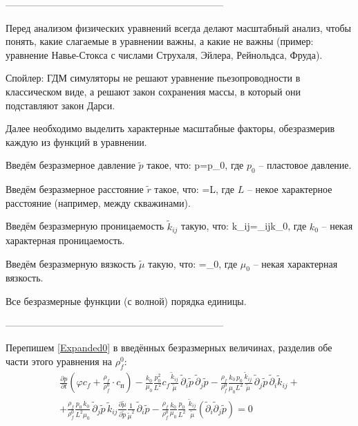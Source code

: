 --------------------------------------------------------------------

Перед анализом физических уравнений всегда делают масштабный анализ, чтобы понять, какие слагаемые в уравнении важны, а какие не важны (пример: уравнение Навье-Стокса с числами Струхаля, Эйлера, Рейнольдса, Фруда).

Спойлер: ГДМ симуляторы не решают уравнение пьезопроводности в классическом виде, а решают закон сохранения массы, в который они подставляют закон Дарси.

Далее необходимо выделить характерные масштабные факторы, обезразмерив каждую из функций в уравнении.

Введём безразмерное давление $\tilde{p}$ такое, что:
\beq
p=\cdot p_0,
\eeq
где $p_0$ -- пластовое давление.

Введём безразмерное расстояние $\tilde{r}$ такое, что:
\beq
{}=\cdot L,
\eeq
где $L$ -- некое характерное расстояние (например, между скважинами).

Введём безразмерную проницаемость $\tilde{k}_{ij}$ такую, что:
\beq
k_{ij}=_{ij}\cdot k_0,
\eeq
где $k_0$ -- некая характерная проницаемость.

Введём безразмерную вязкость $\tilde{\mu}$ такую, что:
\beq
\mu=\tilde{\mu}\cdot\mu_0,
\eeq
где $\mu_0$ -- некая характерная вязкость.

Все безразмерные функции (с волной) порядка единицы.

--------------------------------------------------------------------

Перепишем \eqref{Expanded0} в введённых безразмерных величинах, разделив обе части этого уравнения на $\rho_f^0$:
\begin{multline}
\frac{\partial p}{\partial t}\left(\varphi c_f+\frac{\rho_f}{\rho_f^0}\cdot c_\text{п}\right)-\frac{k_0}{\mu_0}\frac{p_0^2}{L^2}c_f\frac{\tilde{k}_{ij}}{\tilde{\mu}}\,\tilde{\partial}_i\tilde{p}\,\tilde{\partial}_j\tilde{p}-\frac{\rho_f}{\rho_f^0}\frac{k_0\,p_0}{\mu_0L^2}\frac{\tilde{k}_{ij}}{\tilde{\mu}}\,\tilde{\partial}_j\tilde{p}\,\tilde{\partial}_i\tilde{k}_{ij}+\\+\frac{\rho_f}{\rho_f^0}\frac{p_0\,k_0}{L^2\mu_0}\,\tilde{\partial}_j\tilde{p}\,\tilde{k}_{ij}\frac{\partial\tilde{\mu}}{\partial\tilde{p}}\frac{1}{\tilde{\mu}^2}\,\tilde{\partial}_i\tilde{p}-\frac{\rho_f}{\rho_f^0}\frac{k_0}{\mu_0}\frac{p_0}{L^2}\,\frac{\tilde{k}_{ij}}{\tilde{\mu}}\left(\tilde{\partial}_i\tilde{\partial}_j\tilde{p}\right)=0
\end{multline}

